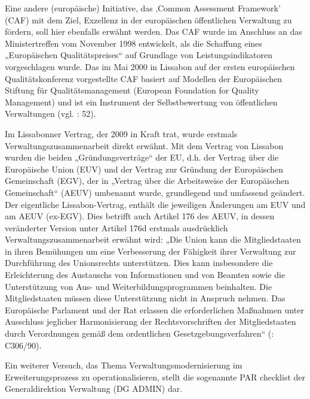 Eine andere (europäische) Initiative, das ‚Common Assessment Framework’ (CAF) mit dem Ziel, Exzellenz in der europäischen öffentlichen Verwaltung zu fördern, soll hier ebenfalls erwähnt werden. Das CAF wurde im Anschluss an das Ministertreffen vom November 1998 entwickelt, als die Schaffung eines „Europäischen Qualitätspreises“ auf Grundlage von Leistungsindikatoren vorgeschlagen wurde. Das im Mai 2000 in Lissabon auf der ersten europäischen Qualitätskonferenz vorgestellte CAF basiert auf Modellen der Europäischen Stiftung für Qualitätsmanagement (European Foundation for Quality Management) und ist ein Instrument der Selbstbewertung von öffentlichen Verwaltungen (vgl. \cite{mangenot}: 52).\par
Im Lissabonner Vertrag, der 2009 in Kraft trat, wurde erstmals Verwaltungszusammenarbeit direkt erwähnt. Mit dem Vertrag von Lissabon wurden die beiden „Gründungsverträge“ der EU, d.h. der Vertrag über die Europäische Union (EUV) und der Vertrag zur Gründung der Europäischen Gemeinschaft (EGV), der in „Vertrag über die Arbeitsweise der Europäischen Gemeinschaft“ (AEUV) umbenannt wurde, grundlegend und umfassend geändert. Der eigentliche Lissabon-Vertrag, enthält die jeweiligen Änderungen am EUV und am AEUV (ex-EGV). Dies betrifft auch Artikel 176 des AEUV, in dessen veränderter Version unter Artikel 176d erstmals ausdrücklich Verwaltungszusammenarbeit erwähnt wird: „Die Union kann die Mitgliedstaaten in ihren Bemühungen um eine Verbesserung der Fähigkeit ihrer Verwaltung zur Durchführung des Unionsrechts unterstützen. Dies kann insbesondere die Erleichterung des Austauschs von Informationen und von Beamten sowie die Unterstützung von Aus- und Weiterbildungsprogrammen beinhalten. Die Mitgliedstaaten müssen diese Unterstützung nicht in Anspruch nehmen. Das Europäische Parlament und der Rat erlassen die erforderlichen Maßnahmen unter Ausschluss jeglicher Harmonisierung der Rechtsvorschriften der Mitgliedstaaten durch Verordnungen gemäß dem ordentlichen Gesetzgebungsverfahren“ (\cite{verLis}: C306/90). \par
Ein weiterer Versuch, das Thema Verwaltungsmodernisierung im Erweiterungsprozess zu operationalisieren, stellt die sogenannte PAR checklist der Generaldirektion Verwaltung (DG ADMIN) dar. 

